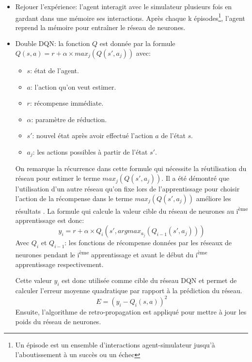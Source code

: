 \begin{itemize}
	\item Rejouer l'expérience: l'agent interagit avec le simulateur plusieurs fois en gardant dans une mémoire ses interactions. Après chaque k épisodes\footnote{Un épisode est un ensemble d'interactions agent-simulateur jusqu'à l'aboutissement à un succès ou un échec}, l'agent reprend la mémoire pour entraîner le réseau de neurones.
	\item Double DQN: la fonction $Q$ est donnée par la formule $Q(s,a) = r + \alpha \times max_j(Q(s',a_j))$ \citep{Mnih2015} avec:
	\begin{itemize}
		\item $s$: état de l'agent.
		\item $a$: l'action qu'on veut estimer.
		\item $r$: récompense immédiate.
		\item $\alpha$: paramètre de réduction.
		\item $s'$: nouvel état après avoir effectué l'action $a$ de l'état $s$.
		\item $a_j$: les actions possibles à partir de l'état $s'$.
	\end{itemize}
	On remarque la récurrence dans cette formule qui nécessite la réutilisation du réseau pour estimer le terme $max_j (Q(s',a_j))$. Il a été démontré que l'utilisation d'un autre réseau qu'on fixe lors de l'apprentissage pour choisir l'action de la récompense dans le terme $max_j (Q(s',a_j))$ améliore les résultats \citep{Mnih2015}. La formule qui calcule la valeur cible du réseau de neurones au i\textsuperscript{ème} apprentissage est donc: 
	\[y_i = r + \alpha \times Q_i(s',argmax_{a_j}(Q_{i-1}(s',a_j)))\]
	Avec $Q_i$ et $Q_{i-1}$: les fonctions de récompense données par les réseaux de neurones pendant le i\textsuperscript{ème} apprentissage et avant le début du i\textsuperscript{ème} apprentissage respectivement.
	\par Cette valeur $y_i$ est donc utilisée comme cible du réseau DQN et permet de calculer l'erreur moyenne quadratique par rapport à la prédiction du réseau.
	 \[E = (y_i - Q_i(s,a))^2\]
	 Ensuite, l'algorithme de retro-propagation est appliqué pour mettre à jour les poids du réseau de neurones.
\end{itemize}
